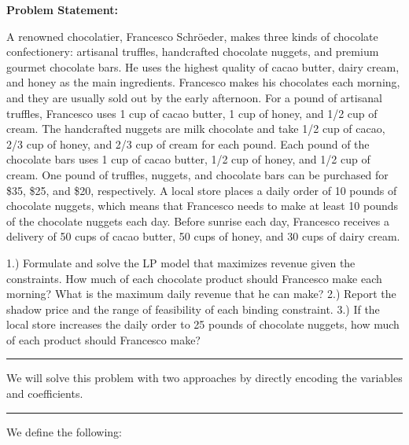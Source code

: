 \documentclass[
]{article}
\begin{document}
\textbf{Problem Statement: }

A renowned chocolatier, Francesco Schröeder, makes three kinds of
chocolate confectionery: artisanal truffles, handcrafted chocolate
nuggets, and premium gourmet chocolate bars. He uses the highest quality
of cacao butter, dairy cream, and honey as the main ingredients.
Francesco makes his chocolates each morning, and they are usually sold
out by the early afternoon. For a pound of artisanal truffles, Francesco
uses 1 cup of cacao butter, 1 cup of honey, and 1/2 cup of cream. The
handcrafted nuggets are milk chocolate and take 1/2 cup of cacao, 2/3
cup of honey, and 2/3 cup of cream for each pound. Each pound of the
chocolate bars uses 1 cup of cacao butter, 1/2 cup of honey, and 1/2 cup
of cream. One pound of truffles, nuggets, and chocolate bars can be
purchased for \$35, \$25, and \$20, respectively. A local store places a
daily order of 10 pounds of chocolate nuggets, which means that
Francesco needs to make at least 10 pounds of the chocolate nuggets each
day. Before sunrise each day, Francesco receives a delivery of 50 cups
of cacao butter, 50 cups of honey, and 30 cups of dairy cream.

1.) Formulate and solve the LP model that maximizes revenue given the
constraints. How much of each chocolate product should Francesco make
each morning? What is the maximum daily revenue that he can make? 2.)
Report the shadow price and the range of feasibility of each binding
constraint. 3.) If the local store increases the daily order to 25
pounds of chocolate nuggets, how much of each product should Francesco
make?

\begin{center}\rule{0.5\linewidth}{0.5pt}\end{center}

We will solve this problem with two approaches by directly encoding the
variables and coefficients.

\begin{center}\rule{0.5\linewidth}{0.5pt}\end{center}

We define the following:
\end{document}
